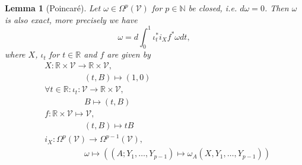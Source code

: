 \documentclass[b5paper,draft,openbib,12pt]{memoir}
\newtheorem{Lemma}[Def]{Lemma}
\begin{document}
\begin{Lemma}[Poincaré]\label{lem poincare}
  Let \(\omega\in \Omega^p(\mathcal{V})\) for 
  \(p\in\mathbb{N}\) be closed, i.e. \(d \omega =0\). 
  Then \(\omega\) is also exact, more precisely we have
  \begin{equation}
  \omega=d \int_{0}^1 \iota^*_t i_X f^* \omega dt,
  \end{equation}
  where \(X\), \(\iota_t\) for \(t\in\mathbb{R}\) and \(f\) are given by
   \begin{align}
   &X: \mathbb{R}\times\mathcal{V}\rightarrow \mathbb{R}\times\mathcal{V},\\
   &\hspace{2cm} (t,B)\mapsto (1,0) \\
  &\forall t \in \mathbb{R}: \iota_t: \mathcal{V}\rightarrow \mathbb{R}\times\mathcal{V},\\
  &\hspace{2cm} B\mapsto (t,B)\\
  &f:\mathbb{R}\times \mathcal{V}\mapsto \mathcal{V},\\
  &\hspace{2cm} (t,B) \mapsto t B\\
  &i_X: \Omega^p(\mathcal{V})\rightarrow \Omega^{p-1}(\mathcal{V}),\\
  &\hspace{2cm} \omega \mapsto ((A;Y_1,\dots, Y_{p-1})\mapsto \omega_A(X,Y_1,\dots,Y_{p-1}))
   \end{align}
  \end{Lemma}
\end{document}
